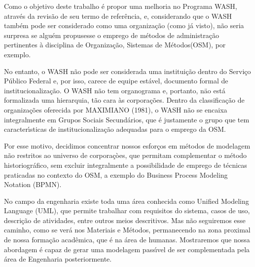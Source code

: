 \documentclass[
12pt,		%
openright,	%
twoside,  %
a4paper,			%
chapter=TITLE,		%
english,			%
french,				%
spanish,			%
brazil				%
]{USPSC-classe/USPSC}
\begin{document}
Como o objetivo deste trabalho \'e propor uma melhoria no Programa WASH, atrav\'es da revis\~ao de seu termo de refer\^encia, e, considerando que o WASH tamb\'em pode ser considerado como uma organiza\c{c}\~ao (como j\'a visto), n\~ao seria surpresa se algu\'em propusesse o emprego de m\'etodos de administra\c{c}\~ao pertinentes \`a disciplina de \textquotedbl Organiza\c{c}\~ao, Sistemas de M\'etodos\textquotedbl  (OSM), por exemplo.





\noindent\begin{center}\mbox{\centering{}}\end{center}


No entanto, o WASH n\~ao pode ser considerada uma institui\c{c}\~ao  dentro do Servi\c{c}o P\'ublico Federal e, por isso, carece de equipe est\'avel, documento formal de institucionaliza\c{c}\~ao. O WASH n\~ao tem organograma e, portanto, näo est\'a formalizada uma hierarquia, t\~ao cara \`as corpora\c{c}\~oes. Dentro da classifica\c{c}\~ao de organiza\c{c}\~oes oferecida por  MAXIMIANO (1981), o WASH n\~ao se encaixa integralmente em \textquotedbl Grupos Sociais Secund\'arios\textquotedbl , que \'e justamente o grupo que tem caracter\'{\i}sticas de institucionaliza\c{c}\~ao adequadas para o emprego da OSM.




Por esse motivo, decidimos concentrar nossos esfor\c{c}os  em m\'etodos de modelagem n\~ao restritos ao universo de corpora\c{c}òes, que permitam complementar o m\'etodo historiogr\'afico, sem excluir integralmente a possibilidade de emprego de t\'ecnicas praticadas no contexto do OSM, a exemplo do Business Process Modeling Notation (BPMN).




No campo da engenharia existe toda uma \'area conhecida como Unified Modeling Language (UML), que permite trabalhar com requisitos do sistema, casos de uso, descri\c{c}\~ao de atividades, entre outros meios descritivos. Mas n\~ao seguiremos esse caminho, como se ver\'a nos Materiais e M\'etodos, permanecendo na zona proximal de nossa forma\c{c}\~ao acad\^emica, que \'e na \'area de humanas. Mostraremos que nossa abordagem \'e capaz de gerar uma modelagem pass\'{\i}vel de ser complementada pela \'area de Engenharia posteriormente.
\end{document}
